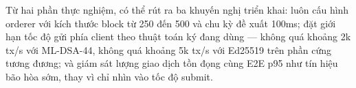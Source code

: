 Từ hai phần thực nghiệm, có thể rút ra ba khuyến nghị triển khai: luôn cấu
hình orderer với kích thước block từ 250 đến 500 và chu kỳ đề xuất 100ms; đặt
giới hạn tốc độ gửi phía client theo thuật toán ký đang dùng --- không quá
khoảng 2k tx/s với ML-DSA-44, không quá khoảng 5k tx/s với Ed25519 trên phần
cứng tương đương; và giám sát lượng giao dịch tồn đọng cùng E2E p95 như tín
hiệu bão hòa sớm, thay vì chỉ nhìn vào tốc độ submit.